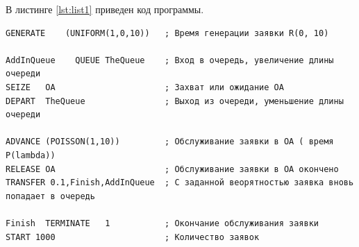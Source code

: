 \documentclass[14pt, a4paper]{extarticle}
\begin{document}
В листинге \ref{lst:list1} приведен код программы. 

\begin{lstlisting}[caption = {Код программы}, label=lst:list1]
GENERATE	(UNIFORM(1,0,10))	; Время генерации заявки R(0, 10)

AddInQueue    QUEUE	TheQueue	; Вход в очередь, увеличение длины очереди
SEIZE	OA						; Захват или ожидание ОА
DEPART	TheQueue				; Выход из очереди, уменьшение длины очереди

ADVANCE	(POISSON(1,10))			; Обслуживание заявки в ОА ( время P(lambda))
RELEASE	OA						; Обслуживание заявки в ОА окончено
TRANSFER 0.1,Finish,AddInQueue	; С заданной веорятностью заявка вновь попадает в очередь

Finish	TERMINATE	1			; Окончание обслуживания заявки
START 1000						; Количество заявок
\end{lstlisting}
\end{document}
